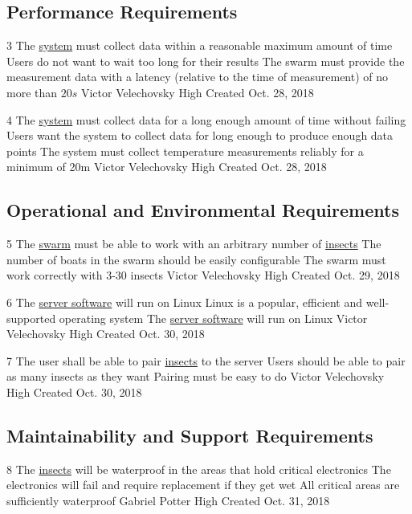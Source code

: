 \documentclass[11pt]{article}
\begin{document}
\subsection{Performance Requirements}

\nonFunctionalRequirement
{3}
{The \hyperref[sec:definitions]{system} must collect data within a reasonable
maximum amount of time}
{Users do not want to wait too long for their results}
{The swarm must provide the measurement data with a latency (relative to the
time of measurement) of no more than $20s$}
{Victor Velechovsky}
{High}
{Created Oct. 28, 2018}

\nonFunctionalRequirement
{4}
{The \hyperref[sec:definitions]{system} must collect data for a long enough
amount of time without failing}
{Users want the system to collect data for long enough to produce enough
data points}
{The system must collect temperature measurements reliably for a minimum of
20m}
{Victor Velechovsky}
{High}
{Created Oct. 28, 2018}

\subsection{Operational and Environmental Requirements}

\nonFunctionalRequirement
{5}
{The \hyperref[sec:definitions]{swarm} must be able to work with an arbitrary
number of \hyperref[sec:definitions]{insects}}
{The number of boats in the swarm should be easily configurable}
{The swarm must work correctly with 3-30 insects}
{Victor Velechovsky}
{High}
{Created Oct. 29, 2018}

\nonFunctionalRequirement
{6}
{The \hyperref[sec:definitions]{server software} will run on Linux}
{Linux is a popular, efficient and well-supported operating system}
{The \hyperref[sec:definitions]{server software} will run on Linux}
{Victor Velechovsky}
{High}
{Created Oct. 30, 2018}

\nonFunctionalRequirement
{7}
{The user shall be able to pair \hyperref[sec:definitions]{insects}
to the server}
{Users should be able to pair as many insects as they want}
{Pairing must be easy to do}
{Victor Velechovsky}
{High}
{Created Oct. 30, 2018}

\subsection{Maintainability and Support Requirements}

\nonFunctionalRequirement
{8}
{The \hyperref[sec:definitions]{insects} will be waterproof in the areas that hold critical electronics}
{The electronics will fail and require replacement if they get wet}
{All critical areas are sufficiently waterproof}
{Gabriel Potter}
{High}
{Created Oct. 31, 2018}
\end{document}
